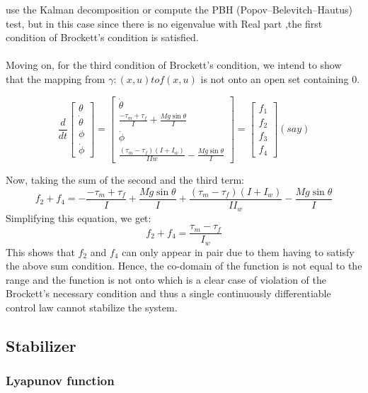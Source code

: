 \documentclass{article}
\begin{document}
use the Kalman decomposition or compute the PBH (Popov–Belevitch–Hautus) test, but in this case
since there is no eigenvalue with Real part ,the first condition of Brockett's condition is satisfied.
\\
\\
Moving on, for the third condition of Brockett's condition, we intend to show that the mapping from 
\( \gamma : (x, u) to f(x, u) \) is not onto an open set containing 0.
\begin{center}
\[
\frac{d}{dt}
\begin{bmatrix}
\theta \\
\dot{\theta} \\
\phi \\
\dot{\phi} 
\end{bmatrix}
=
\begin{bmatrix}
\dot{\theta} \\
\frac{-\tau_m + \tau_f}{I} + \frac{Mg\sin\theta}{I} \\
\dot{\phi} \\
\frac{(\tau_m - \tau_f)(I + I_w)}{IIw} - \frac{Mg \sin\theta}{I}
\end{bmatrix}
=
\begin{bmatrix}
f_1\\
f_2\\
f_3\\
f_4
\end{bmatrix}
(say)
\]
\end{center}
Now, taking the sum of the second and the third term:
\[
f_2 + f_4 = -\frac{-\tau_m + \tau_f}{I} + \frac{Mg\sin{\theta}}{I} + \frac{(\tau_m - \tau_f)(I + I_w)}{II_w}- \frac{Mg\sin{\theta}}{I}
\]
Simplifying this equation, we get:
\[
f_2 + f_4 = \frac{\tau_m - \tau_f}{I_w}
\]
This shows that \(f_2 \) and \(f_4\) can only appear in pair due to them having to satisfy the above sum condition.
Hence, the co-domain of the function is not equal to the range and the function is not onto which is a clear case of 
violation of the Brockett's necessary condition and thus a single continuously differentiable control law cannot stabilize the system.
\subsection{Stabilizer}

\subsubsection*{Lyapunov function}
\end{document}
